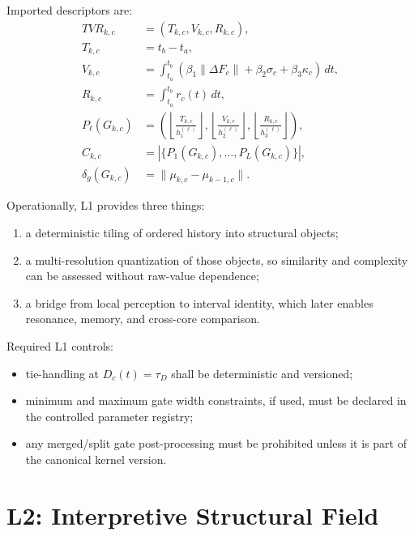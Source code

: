 Imported descriptors are:
\begin{align*}
TVR_{k,c} &= (T_{k,c},V_{k,c},R_{k,c}),\\
T_{k,c} &= t_b-t_a,\\
V_{k,c} &= \int_{t_a}^{t_b}(\beta_1\lVert\Delta F_c\rVert+\beta_2\sigma_c+\beta_3\kappa_c)\,dt,\\
R_{k,c} &= \int_{t_a}^{t_b}r_c(t)\,dt,\\
P_\ell(G_{k,c}) &= \left(\left\lfloor\frac{T_{k,c}}{h_1^{(\ell)}}\right\rfloor,\left\lfloor\frac{V_{k,c}}{h_2^{(\ell)}}\right\rfloor,\left\lfloor\frac{R_{k,c}}{h_3^{(\ell)}}\right\rfloor\right),\\
C_{k,c} &= \left|\{P_1(G_{k,c}),\dots,P_L(G_{k,c})\}\right|,\\
\delta_g(G_{k,c}) &= \lVert \mu_{k,c}-\mu_{k-1,c}\rVert.
\end{align*}

Operationally, L1 provides three things:
\begin{enumerate}[leftmargin=1.2cm]
    \item a deterministic tiling of ordered history into structural objects;
    \item a multi-resolution quantization of those objects, so similarity and complexity can be assessed without raw-value dependence;
    \item a bridge from local perception to interval identity, which later enables resonance, memory, and cross-core comparison.
\end{enumerate}

Required L1 controls:
\begin{itemize}
    \item tie-handling at $D_c(t)=\tau_D$ shall be deterministic and versioned;
    \item minimum and maximum gate width constraints, if used, must be declared in the controlled parameter registry;
    \item any merged/split gate post-processing must be prohibited unless it is part of the canonical kernel version.
\end{itemize}

\section{L2: Interpretive Structural Field}

